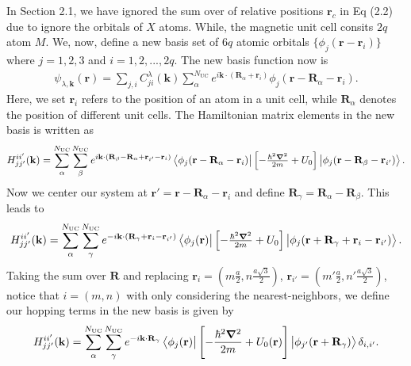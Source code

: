 \documentclass{report}
\newcommand{\f}[2]{\dfrac{#1}{#2}}
\begin{document}
In Section 2.1, we have ignored the sum over of relative positions $\mathbf{r}_{c}$ in Eq (2.2) due to ignore the orbitals of $X$ atoms. While, the magnetic unit cell consits $2q$ atom $M$. We, now, define a new basis set of $6q$ atomic orbitals $\{ \phi_{j}(\mathbf{r} - \mathbf{r}_{i}) \}$ where $j=1,2,3$ and $i = 1,2,...,2q$.
The new basis function now is
\begin{gather}
	\psi_{\lambda,\mathbf{k}}(\mathbf{r}) = \sum_{j,i} C_{ji}^{\lambda}(\mathbf{k}) \sum_{{\alpha}}^{N_{\text{UC}}} e^{i\mathbf{k}\cdot(\mathbf{R}_{\alpha} + \mathbf{r}_{i})} \phi_{j}(\mathbf{r} - \mathbf{R}_{\alpha} - \mathbf{r}_{i}).
\end{gather}
Here, we set $\mathbf{r}_{i}$ refers to the position of an atom in a unit cell, while $\mathbf{R}_{\alpha}$ denotes the position of different unit cells.
The Hamiltonian matrix elements in the new basis is written as
\begin{gather}
	H_{jj'}^{ii'}(\mathbf{k})
	= \sum_{{\alpha}}^{N_\text{UC}}\sum_{{\beta}}^{N_\text{UC}} e^{i \mathbf{k} \cdot (\mathbf{R}_{\beta} - \mathbf{R}_{\alpha} + \mathbf{r}_{i'} - \mathbf{r}_{i})}  \bra{\phi_{j}(\mathbf{r} - \mathbf{R}_{\alpha} - \mathbf{r}_{i})} \left[-\tfrac{\hbar^{2} \boldsymbol{\nabla}^{2}}{2m} + U_{0}\right] \ket{\phi_{j}(\mathbf{r} - \mathbf{R}_{\beta} - \mathbf{r}_{i'})}.
\end{gather}
Now we center our system at $\mathbf{r}'=\mathbf{r} - \mathbf{R}_{\alpha} - \mathbf{r}_{i}$ and define $\mathbf{R}_{\gamma} = \mathbf{R}_{\alpha} - \mathbf{R}_{\beta}$. This leads to
\begin{gather}
	H_{jj'}^{ii'}(\mathbf{k})
	= \sum_{{\alpha}}^{N_\text{UC}}\sum_{{\gamma}}^{N_\text{UC}} e^{-i \mathbf{k} \cdot (\mathbf{R}_{\gamma} + \mathbf{r}_{i} - \mathbf{r}_{i'})}  \bra{\phi_{j}(\mathbf{r})} \left[-\tfrac{\hbar^{2} \boldsymbol{\nabla}^{2}}{2m} + U_{0}\right] \ket{\phi_{j}(\mathbf{r} + \mathbf{R}_{\gamma} + \mathbf{r}_{i} - \mathbf{r}_{i'})}.
\end{gather}
Taking the sum over $\mathbf{R}$ and replacing $\mathbf{r}_{i} = \left(m \frac{a}{2}, n \frac{a\sqrt{3}}{2}\right)$, $\mathbf{r}_{i'} = \left(m' \frac{a}{2}, n' \frac{a\sqrt{3}}{2}\right)$, notice that $i = (m,n)$ with only considering the nearest-neighbors, we define our hopping terms in the new basis is given by
\begin{gather}
	H_{jj'}^{ii'}(\mathbf{k}) = \sum_{{\alpha}}^{N_\text{UC}}\sum_{{\gamma}}^{N_\text{UC}} e^{-i \mathbf{k}\cdot \mathbf{R}_{\gamma}} \bra{\phi_{j}(\mathbf{r})} \left[-\f{\hbar^{2} \boldsymbol{\nabla}^{2}}{2m} + U_{0}(\mathbf{r})\right] \ket{\phi_{j'}(\mathbf{r}+\mathbf{R}_{\gamma})}\delta_{i,i'}.
\end{gather}
\end{document}
